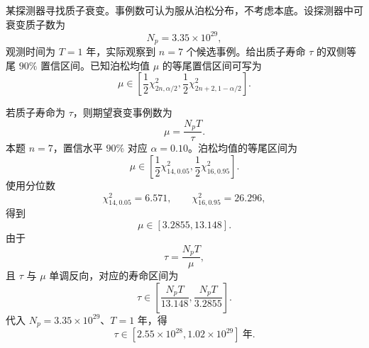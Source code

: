 \begin{question}[泊松计数与寿命置信区间]
某探测器寻找质子衰变。事例数可认为服从泊松分布，不考虑本底。设探测器中可衰变质子数为
\[
N_p=3.35\times10^{29},
\]
观测时间为 $T=1$ 年，实际观察到 $n=7$ 个候选事例。给出质子寿命 $\tau$ 的双侧等尾 $90\%$ 置信区间。已知泊松均值 $\mu$ 的等尾置信区间可写为
\[
\mu\in\left[\frac12\chi^2_{2n,\alpha/2},\frac12\chi^2_{2n+2,1-\alpha/2}\right].
\]
\begin{solution}
若质子寿命为 $\tau$，则期望衰变事例数为
\[
\mu=\frac{N_pT}{\tau}.
\]
本题 $n=7$，置信水平 $90\%$ 对应 $\alpha=0.10$。泊松均值的等尾区间为
\[
\mu\in\left[\frac12\chi^2_{14,0.05},\frac12\chi^2_{16,0.95}\right].
\]
使用分位数
\[
\chi^2_{14,0.05}=6.571,
\qquad
\chi^2_{16,0.95}=26.296,
\]
得到
\[
\mu\in[3.2855,13.148].
\]
由于
\[
\tau=\frac{N_pT}{\mu},
\]
且 $\tau$ 与 $\mu$ 单调反向，对应的寿命区间为
\[
\tau\in\left[\frac{N_pT}{13.148},\frac{N_pT}{3.2855}\right].
\]
代入 $N_p=3.35\times10^{29}$、$T=1$ 年，得
\[
\tau\in[2.55\times10^{28},1.02\times10^{29}]\ \text{年}.
\]
\end{solution}
\end{question}

